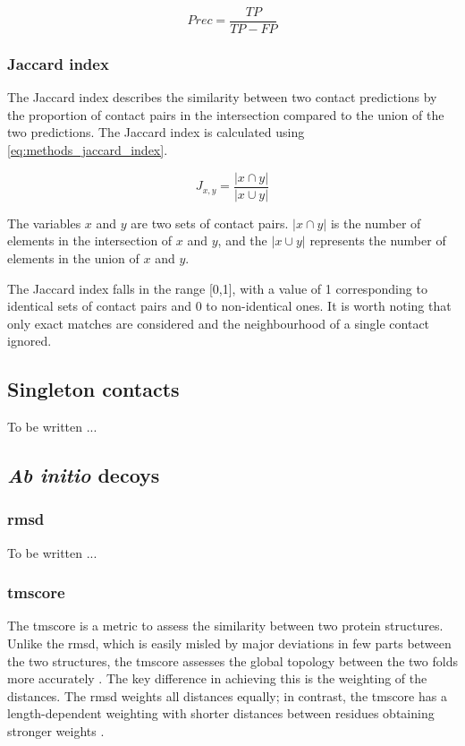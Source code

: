 \begin{equation} 
Prec = \frac{TP}{TP-FP}
\label{eq:methods_precision}
\end{equation}

\subsubsection{Jaccard index} \label{sec:methods_contact_jaccard_idx}
The Jaccard index describes the similarity between two contact predictions by the proportion of contact pairs in the intersection compared to the union of the two predictions. The Jaccard index is calculated using \cref{eq:methods_jaccard_index}.

\begin{equation} 
J_{x,y}=\frac{\left |x \cap y\right |}{\left |x \cup y\right |}
\label{eq:methods_jaccard_index}
\end{equation}

The variables $x$ and $y$ are two sets of contact pairs. $\left |x \cap y\right |$ is the number of elements in the intersection of $x$ and $y$, and the $\left |x \cup y\right |$ represents the number of elements in the union of $x$ and $y$.

The Jaccard index falls in the range [0,1], with a value of 1 corresponding to identical sets of contact pairs and 0 to non-identical ones. It is worth noting that only exact matches are considered and the neighbourhood of a single contact ignored.

\subsection{Singleton contacts} \label{sec:methods_contact_singletons}
To be written ...

\subsection{\textit{Ab initio} decoys}
\subsubsection{\acrlong{rmsd}} \label{sec:methods_abinitio_rmsd}
To be written ...
\subsubsection{\acrlong{tmscore}} \label{sec:methods_abinitio_tmscore}
The \gls{tmscore} is a metric to assess the similarity between two protein structures. Unlike the \gls{rmsd}, which is easily misled by major deviations in few parts between the two structures, the \gls{tmscore} assesses the global topology between the two folds more accurately \cite{Zhang2005-hx}. The key difference in achieving this is the weighting of the distances. The \gls{rmsd} weights all distances equally; in contrast, the \gls{tmscore} has a length-dependent weighting with shorter distances between residues obtaining stronger weights \cite{Zhang2005-hx}.

